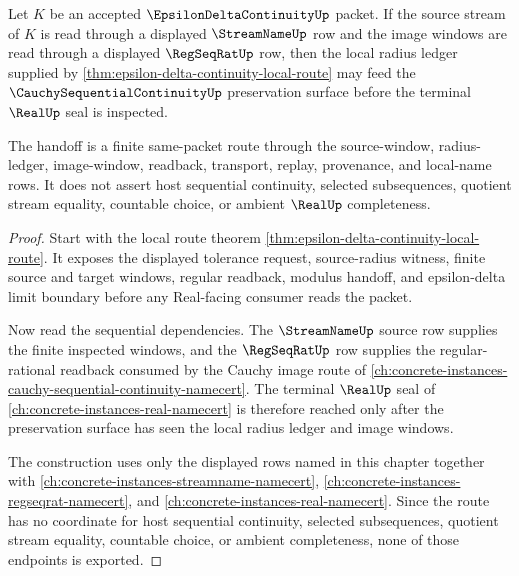 \begin{theorem}
\label{thm:epsilon-delta-sequential-continuity-cauchy-handoff}
Let $K$ be an accepted $\EpsilonDeltaContinuityUp$ packet. If the source stream of $K$ is read through a displayed $\StreamNameUp$ row and the image windows are read through a displayed $\RegSeqRatUp$ row, then the local radius ledger supplied by \autoref{thm:epsilon-delta-continuity-local-route} may feed the $\CauchySequentialContinuityUp$ preservation surface before the terminal $\RealUp$ seal is inspected.

The handoff is a finite same-packet route through the source-window, radius-ledger, image-window, readback, transport, replay, provenance, and local-name rows. It does not assert host sequential continuity, selected subsequences, quotient stream equality, countable choice, or ambient $\RealUp$ completeness.
\end{theorem}
\begin{proof}
Start with the local route theorem \autoref{thm:epsilon-delta-continuity-local-route}. It exposes the displayed tolerance request, source-radius witness, finite source and target windows, regular readback, modulus handoff, and epsilon-delta limit boundary before any Real-facing consumer reads the packet.

Now read the sequential dependencies. The $\StreamNameUp$ source row supplies the finite inspected windows, and the $\RegSeqRatUp$ row supplies the regular-rational readback consumed by the Cauchy image route of \autoref{ch:concrete-instances-cauchy-sequential-continuity-namecert}. The terminal $\RealUp$ seal of \autoref{ch:concrete-instances-real-namecert} is therefore reached only after the preservation surface has seen the local radius ledger and image windows.

The construction uses only the displayed rows named in this chapter together with \autoref{ch:concrete-instances-streamname-namecert}, \autoref{ch:concrete-instances-regseqrat-namecert}, and \autoref{ch:concrete-instances-real-namecert}. Since the route has no coordinate for host sequential continuity, selected subsequences, quotient stream equality, countable choice, or ambient completeness, none of those endpoints is exported.
\end{proof}


